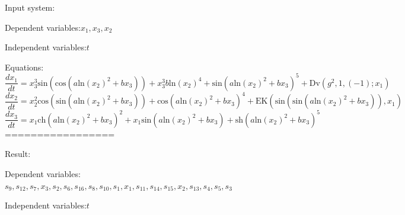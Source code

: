 \documentclass[10pt,a4paper]{article}
\begin{document}
Input system:

Dependent variables:$x_{1}, x_{3}, x_{2}$

Independent variables:$t$

Equations:
\begin{dmath*}\frac{dx_{1}}{dt} = x_{3} ^ {3}  \text{sin}\left(\text{cos}\left(a  \text{ln}\left(x_{2}\right) ^ {2} + b  x_{3}\right)\right) + x_{3} ^ {3}  b  \text{ln}\left(x_{2}\right) ^ {4} + \text{sin}\left(a  \text{ln}\left(x_{2}\right) ^ {2} + b  x_{3}\right) ^ {5} + \text{Dv}\left(g ^ {2}, 1, \left(-1\right); x_{1}\right)\end{dmath*}
\begin{dmath*}\frac{dx_{2}}{dt} = x_{2} ^ {2}  \text{cos}\left(\text{sin}\left(a  \text{ln}\left(x_{2}\right) ^ {2} + b  x_{3}\right)\right) + \text{cos}\left(a  \text{ln}\left(x_{2}\right) ^ {2} + b  x_{3}\right) ^ {4} + \text{EK}\left(\text{sin}\left(\text{sin}\left(a  \text{ln}\left(x_{2}\right) ^ {2} + b  x_{3}\right)\right), x_{1}\right)\end{dmath*}
\begin{dmath*}\frac{dx_{3}}{dt} = x_{1}  \text{ch}\left(a  \text{ln}\left(x_{2}\right) ^ {2} + b  x_{3}\right) ^ {2} + x_{1}  \text{sin}\left(a  \text{ln}\left(x_{2}\right) ^ {2} + b  x_{3}\right) + \text{sh}\left(a  \text{ln}\left(x_{2}\right) ^ {2} + b  x_{3}\right) ^ {5}\end{dmath*}
=================

Result:

Dependent variables:$s_{9}, s_{12}, s_{7}, x_{3}, s_{2}, s_{6}, s_{16}, s_{8}, s_{10}, s_{1}, x_{1}, s_{11}, s_{14}, s_{15}, x_{2}, s_{13}, s_{4}, s_{5}, s_{3}$

Independent variables:$t$
\end{document}
